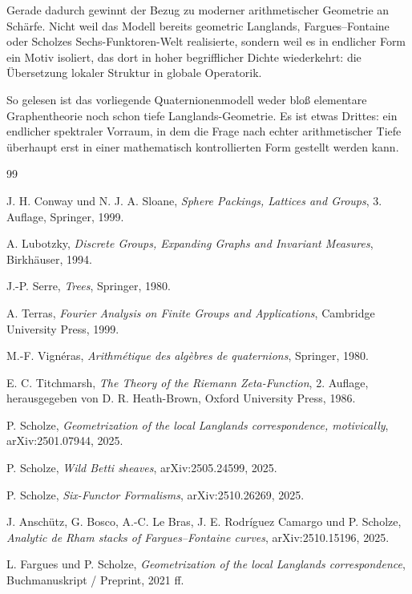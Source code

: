 \documentclass[12pt,a4paper]{article}
\theoremstyle{plain}
\theoremstyle{definition}
\theoremstyle{remark}
\begin{document}
	Gerade dadurch gewinnt der Bezug zu moderner arithmetischer Geometrie an Schärfe.
	Nicht weil das Modell bereits geometric Langlands,
	Fargues--Fontaine oder Scholzes Sechs-Funktoren-Welt realisierte,
	sondern weil es in endlicher Form ein Motiv isoliert,
	das dort in hoher begrifflicher Dichte wiederkehrt:
	die Übersetzung lokaler Struktur in globale Operatorik.
	
	So gelesen ist das vorliegende Quaternionenmodell weder bloß
	elementare Graphentheorie noch schon tiefe Langlands-Geometrie.
	Es ist etwas Drittes:
	ein endlicher spektraler Vorraum,
	in dem die Frage nach echter arithmetischer Tiefe
	überhaupt erst in einer mathematisch kontrollierten Form gestellt werden kann.
	
	\begin{thebibliography}{99}
		
		J. H. Conway und N. J. A. Sloane,
		\emph{Sphere Packings, Lattices and Groups},
		3. Auflage, Springer, 1999.
		
		A. Lubotzky,
		\emph{Discrete Groups, Expanding Graphs and Invariant Measures},
		Birkhäuser, 1994.
		
		J.-P. Serre,
		\emph{Trees},
		Springer, 1980.
		
		A. Terras,
		\emph{Fourier Analysis on Finite Groups and Applications},
		Cambridge University Press, 1999.
		
		M.-F. Vignéras,
		\emph{Arithmétique des algèbres de quaternions},
		Springer, 1980.
		
		E. C. Titchmarsh,
		\emph{The Theory of the Riemann Zeta-Function},
		2. Auflage, herausgegeben von D. R. Heath-Brown,
		Oxford University Press, 1986.
		
		P. Scholze,
		\emph{Geometrization of the local Langlands correspondence, motivically},
		arXiv:2501.07944, 2025.
		
		P. Scholze,
		\emph{Wild Betti sheaves},
		arXiv:2505.24599, 2025.
		
		P. Scholze,
		\emph{Six-Functor Formalisms},
		arXiv:2510.26269, 2025.
		
		J. Anschütz, G. Bosco, A.-C. Le Bras, J. E. Rodríguez Camargo und P. Scholze,
		\emph{Analytic de Rham stacks of Fargues--Fontaine curves},
		arXiv:2510.15196, 2025.
		
		L. Fargues und P. Scholze,
		\emph{Geometrization of the local Langlands correspondence},
		Buchmanuskript / Preprint, 2021 ff.
		
	\end{thebibliography}
	
\end{document}
